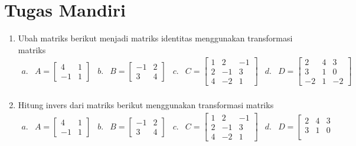 \documentclass{article}   %
\begin{document}
		\section{Tugas Mandiri}
		\begin{enumerate}
		\item Ubah matriks berikut menjadi matriks identitas menggunakan transformasi matriks
		$$
		\begin{array}{llllllllll} 
			a. & 	A=\left[
			\begin{array}{rr} 
				4 & 1\\
				-1 &1 
			\end{array} 
			\right]
			& b. & B=	\left[
			\begin{array}{rr} 
				-1 & 2\\
				3  & 4 
			\end{array} 
			\right]
			& c. & C=	\left[
			\begin{array}{rrr} 
				1 & 2 & -1\\
				2 & -1 & 3\\
				4 & -2 & 1 
			\end{array} 
			\right]
			& d. &  D=\left[
			\begin{array}{rrr} 
				2 & 4 & 3\\
				3 & 1 & 0\\
				-2 &1 & -2 
			\end{array} 
			\right]
			\\
		\end{array} 
		$$
		\item Hitung invers dari matriks berikut menggunakan transformasi matriks%
		$$
				\begin{array}{llllllllll} 
			a. & 	A=\left[
			\begin{array}{rr} 
				4 & 1\\
				-1 &1 
			\end{array} 
			\right]
			& b. & B=	\left[
			\begin{array}{rr} 
				-1 & 2\\
				3  & 4 
			\end{array} 
			\right]
			& c. & C=	\left[
			\begin{array}{rrr} 
				1 & 2 & -1\\
				2 & -1 & 3\\
				4 & -2 & 1 
			\end{array} 
			\right]
			& d. &  D=\left[
			\begin{array}{rrr} 
				2 & 4 & 3\\
				3 & 1 & 0\\

\end{array}
\end{array}$$
\end{enumerate}
\end{document}
